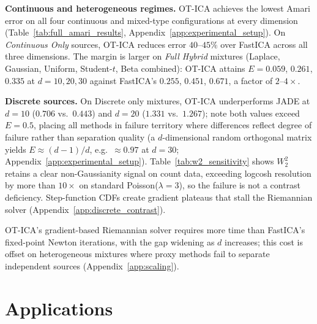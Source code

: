 \documentclass[accepted]{tpm2026} %
\begin{document}
\textbf{Continuous and heterogeneous regimes.} OT-ICA achieves the lowest Amari error on all four continuous and mixed-type configurations at every 
dimension (Table~\ref{tab:full_amari_results}, Appendix~\ref{app:experimental_setup}). On \textit{Continuous Only} sources, 
OT-ICA reduces error $40$--$45\%$ over FastICA across all three dimensions. The margin is larger on \textit{Full Hybrid} mixtures 
(Laplace, Gaussian, Uniform, Student-$t$, Beta combined): OT-ICA attains $E = 0.059$, $0.261$, $0.335$ at $d = 10, 20, 30$ against 
FastICA's $0.255$, $0.451$, $0.671$, a factor of $2$--$4\times$.

\textbf{Discrete sources.} On Discrete only mixtures, OT-ICA underperforms JADE at $d = 10$ ($0.706$ vs.\ $0.443$) and $d = 20$ ($1.331$ vs.\ $1.267$); note both values exceed $E = 0.5$, placing all methods in failure territory where differences reflect degree of failure rather than separation quality (a $d$-dimensional random orthogonal matrix yields $E \approx (d-1)/d$, e.g.\ $\approx 0.97$ at $d=30$; Appendix~\ref{app:experimental_setup}). Table~\ref{tab:w2_sensitivity} shows $W_2^2$ retains a clear non-Gaussianity signal on count data, exceeding logcosh resolution by more than $10{\times}$ on standard Poisson($\lambda=3$), so the failure is not a contrast deficiency. Step-function CDFs create gradient plateaus that stall the Riemannian solver (Appendix~\ref{app:discrete_contrast}).


OT-ICA's gradient-based Riemannian solver requires more time than FastICA's fixed-point Newton iterations, with the gap widening as $d$ increases; 
this cost is offset on heterogeneous mixtures where proxy methods fail to separate independent sources  (Appendix~\ref{app:scaling}).

\section{ Applications}\label{sec:applications}
\end{document}
